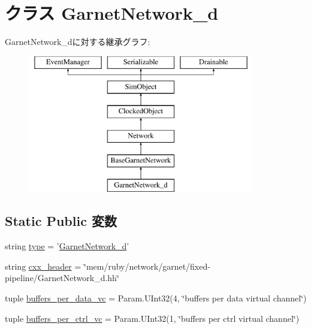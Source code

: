 \hypertarget{classGarnetNetwork__d_1_1GarnetNetwork__d}{
\section{クラス GarnetNetwork\_\-d}
\label{classGarnetNetwork__d_1_1GarnetNetwork__d}
}
GarnetNetwork\_\-dに対する継承グラフ:\begin{figure}[H]
\begin{center}
\leavevmode
\includegraphics[height=6cm]{classGarnetNetwork__d_1_1GarnetNetwork__d}
\end{center}
\end{figure}
\subsection*{Static Public 変数}
\begin{DoxyCompactItemize}
\item 
string \hyperlink{classGarnetNetwork__d_1_1GarnetNetwork__d_acce15679d830831b0bbe8ebc2a60b2ca}{type} = '\hyperlink{classGarnetNetwork__d_1_1GarnetNetwork__d}{GarnetNetwork\_\-d}'
\item 
string \hyperlink{classGarnetNetwork__d_1_1GarnetNetwork__d_a17da7064bc5c518791f0c891eff05fda}{cxx\_\-header} = \char`\"{}mem/ruby/network/garnet/fixed-\/pipeline/GarnetNetwork\_\-d.hh\char`\"{}
\item 
tuple \hyperlink{classGarnetNetwork__d_1_1GarnetNetwork__d_ac11e1ecbc34486db656be113250046ec}{buffers\_\-per\_\-data\_\-vc} = Param.UInt32(4, \char`\"{}buffers per data virtual channel\char`\"{})
\item 
tuple \hyperlink{classGarnetNetwork__d_1_1GarnetNetwork__d_a62996d349473875fdaf9a0ec4561bc46}{buffers\_\-per\_\-ctrl\_\-vc} = Param.UInt32(1, \char`\"{}buffers per ctrl virtual channel\char`\"{})
\end{DoxyCompactItemize}


